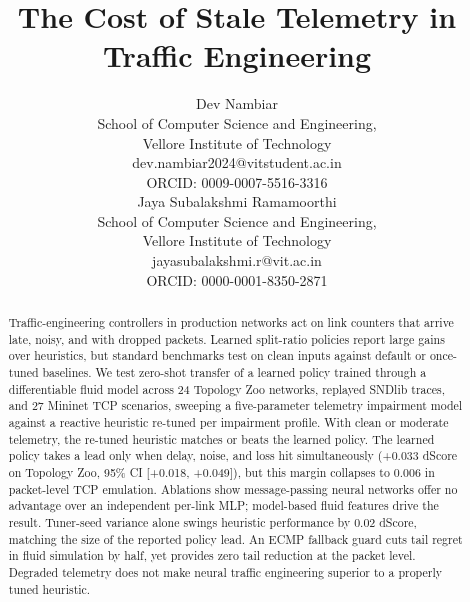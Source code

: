 \documentclass[journal]{IEEEtran}
\begin{document}
\title{The Cost of Stale Telemetry in Traffic Engineering}
\author{\begin{minipage}[t]{0.46\linewidth}\centering
Dev Nambiar\\
\footnotesize School of Computer Science and Engineering,\\
Vellore Institute of Technology\\
dev.nambiar2024@vitstudent.ac.in\\
ORCID: 0009-0007-5516-3316
\end{minipage}\hfill%
\begin{minipage}[t]{0.46\linewidth}\centering
Jaya Subalakshmi Ramamoorthi\\
\footnotesize School of Computer Science and Engineering,\\
Vellore Institute of Technology\\
jayasubalakshmi.r@vit.ac.in\\
ORCID: 0000-0001-8350-2871
\end{minipage}}
\maketitle
\begin{abstract}
Traffic-engineering controllers in production networks act on link counters that arrive late, noisy, and with dropped packets. Learned split-ratio policies report large gains over heuristics, but standard benchmarks test on clean inputs against default or once-tuned baselines. We test zero-shot transfer of a learned policy trained through a differentiable fluid model across 24 Topology Zoo networks, replayed SNDlib traces, and 27 Mininet TCP scenarios, sweeping a five-parameter telemetry impairment model against a reactive heuristic re-tuned per impairment profile. With clean or moderate telemetry, the re-tuned heuristic matches or beats the learned policy. The learned policy takes a lead only when delay, noise, and loss hit simultaneously (+0.033 dScore on Topology Zoo, 95\% CI [+0.018, +0.049]), but this margin collapses to 0.006 in packet-level TCP emulation. Ablations show message-passing neural networks offer no advantage over an independent per-link MLP; model-based fluid features drive the result. Tuner-seed variance alone swings heuristic performance by 0.02 dScore, matching the size of the reported policy lead. An ECMP fallback guard cuts tail regret in fluid simulation by half, yet provides zero tail reduction at the packet level. Degraded telemetry does not make neural traffic engineering superior to a properly tuned heuristic.
\end{abstract}
\end{document}
